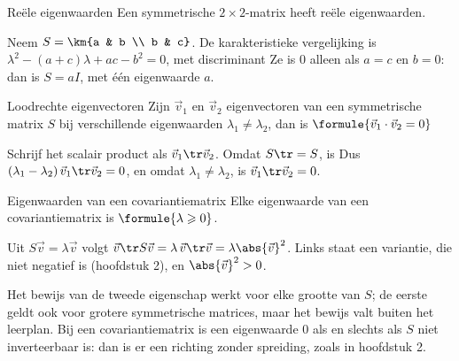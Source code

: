 \begin{theorie}
\begin{stelling}{Reële eigenwaarden}
Een symmetrische $2 \times 2$-matrix heeft reële eigenwaarden.
\end{stelling}

\begin{bewijs}
Neem $S = \km{a & b \\ b & c}$. De karakteristieke vergelijking is $\lambda^2 - (a + c)\lambda + ac - b^2 = 0$, met discriminant
Ze is 0 alleen als $a = c$ en $b = 0$: dan is $S = aI$, met één eigenwaarde $a$.
\end{bewijs}

\begin{stelling}{Loodrechte eigenvectoren}
Zijn $\vec v_1$ en $\vec v_2$ eigenvectoren van een symmetrische matrix $S$ bij verschillende eigenwaarden $\lambda_1 \neq \lambda_2$, dan is \qquad $\formule{\vec v_1 \cdot \vec v_2 = 0}$
\end{stelling}

\begin{bewijs}
Schrijf het scalair product als $\vec v_1\tr\vec v_2$. Omdat $S\tr = S$, is
Dus $(\lambda_1 - \lambda_2)\,\vec v_1\tr\vec v_2 = 0$, en omdat $\lambda_1 \neq \lambda_2$, is $\vec v_1\tr\vec v_2 = 0$.
\end{bewijs}

\begin{stelling}{Eigenwaarden van een covariantiematrix}
Elke eigenwaarde van een covariantiematrix is $\formule{\lambda \geqslant 0}$.
\end{stelling}

\begin{bewijs}
Uit $S\vec v = \lambda\vec v$ volgt $\vec v\tr S\vec v = \lambda\,\vec v\tr\vec v = \lambda\abs{\vec v}^2$. Links staat een variantie, die niet negatief is (hoofdstuk 2), en $\abs{\vec v}^2 > 0$.
\end{bewijs}
\end{theorie}

Het bewijs van de tweede eigenschap werkt voor elke grootte van $S$; de eerste geldt ook voor grotere symmetrische matrices, maar het bewijs valt buiten het leerplan. Bij een covariantiematrix is een eigenwaarde 0 als en slechts als $S$ niet inverteerbaar is: dan is er een richting zonder spreiding, zoals in hoofdstuk 2.

